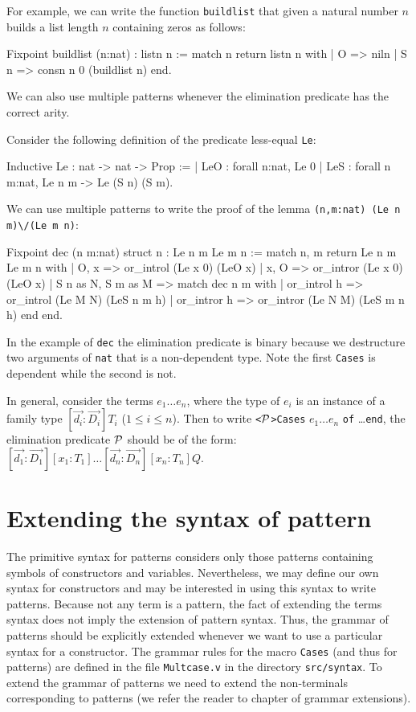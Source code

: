 For example, we can write 
the function \verb+buildlist+ that given a natural number
$n$ builds a list length $n$ containing zeros as follows:

\begin{coq_example}
Fixpoint buildlist (n:nat) : listn n :=
  match n return listn n with
  | O => niln
  | S n => consn n 0 (buildlist n)
  end.
\end{coq_example}

We can also use multiple patterns whenever the elimination predicate has
the correct arity. 

Consider the following definition of the predicate less-equal
\verb+Le+:

\begin{coq_example}
Inductive Le : nat -> nat -> Prop :=
  | LeO : forall n:nat, Le 0%
  | LeS : forall n m:nat, Le n m -> Le (S n) (S m).
\end{coq_example}

We can use multiple patterns to write  the proof of the lemma
 \verb+(n,m:nat) (Le n m)\/(Le m n)+:

\begin{coq_example}
Fixpoint dec (n m:nat) {struct n} : Le n m \/ Le m n :=
  match n, m return Le n m \/ Le m n with
  | O, x => or_introl (Le x 0) (LeO x)
  | x, O => or_intror (Le x 0) (LeO x)
  | S n as N, S m as M =>
      match dec n m with
      | or_introl h => or_introl (Le M N) (LeS n m h)
      | or_intror h => or_intror (Le N M) (LeS m n h)
      end
  end.
\end{coq_example}
In the example of \verb+dec+ the elimination predicate is binary
because we destructure two arguments of \verb+nat+ that is a
non-dependent type. Note the first \verb+Cases+ is dependent while the
second  is not.

In general, consider the terms $e_1\ldots e_n$,
where  the type of $e_i$ is an instance of a family type
$[\vec{d_i}:\vec{D_i}]T_i$  ($1\leq i
\leq n$). Then to  write \verb+<+${\cal P}$\verb+>Cases+  $e_1\ldots
e_n$ \verb+of+ \ldots \verb+end+, the 
elimination predicate ${\cal P}$ should be of the form:
$[\vec{d_1}:\vec{D_1}][x_1:T_1]\ldots [\vec{d_n}:\vec{D_n}][x_n:T_n]Q.$




\section{Extending the syntax of pattern}
The primitive syntax for patterns considers only those patterns containing
symbols of constructors and variables. Nevertheless, we
may define our own syntax for  constructors and may be interested in
using this syntax to write patterns. 
Because not  any term is a pattern, the fact of extending the terms
syntax does not imply the extension of pattern syntax. Thus,  
the grammar of patterns should be explicitly extended whenever we
want to use a particular syntax for a constructor.
The grammar rules for the macro  \verb+Cases+ (and thus for patterns)
are defined in the file \verb+Multcase.v+ in the directory
\verb+src/syntax+. To extend the grammar of patterns 
we need to extend the non-terminals corresponding to patterns
(we refer the reader to chapter of grammar extensions).

